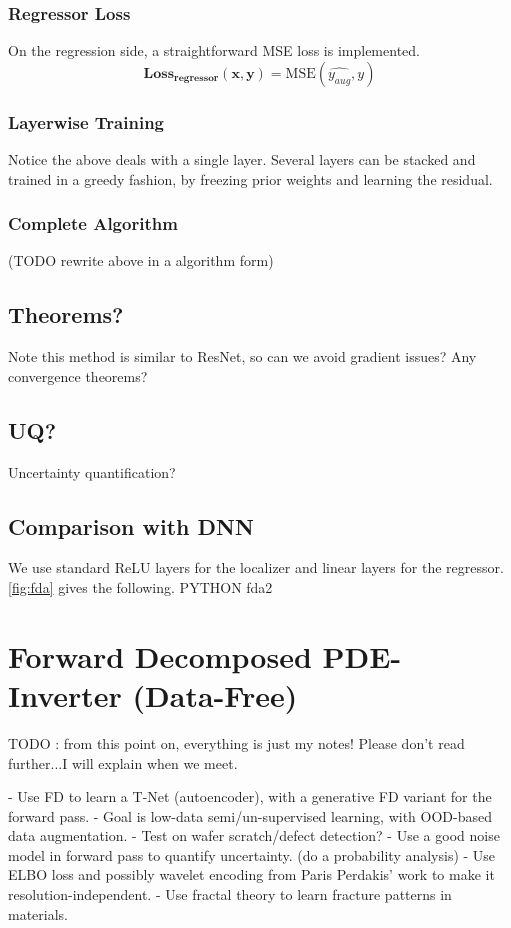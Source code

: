 \subsubsection{Regressor Loss}
On the regression side, a straightforward MSE loss is implemented.
\[
\mathbf{\text{Loss}_\text{regressor}(x,y)} = \text{MSE}(\hat{y_{aug}},y)
\]

\subsubsection{Layerwise Training}
Notice the above deals with a single layer. Several layers can be stacked and trained in a greedy fashion, by freezing prior weights and learning the residual.

\subsubsection{Complete Algorithm}
(TODO rewrite above in a algorithm form)

\subsection{Theorems?}
Note this method is similar to ResNet, so can we avoid gradient issues?
Any convergence theorems?
\subsection{UQ?}
Uncertainty quantification?

\subsection{Comparison with DNN}
We use standard ReLU layers for the localizer and linear layers for the regressor. \ref{fig:fda} gives the following.
PYTHON fda2

\section{Forward Decomposed PDE-Inverter (Data-Free)}

TODO : from this point on, everything is just my notes! 
Please don't read further...I will explain when we meet.

- Use FD to learn a T-Net (autoencoder), with a generative FD variant for the forward pass.
- Goal is low-data semi/un-supervised learning, with OOD-based data augmentation.
- Test on wafer scratch/defect detection?
- Use a good noise model in forward pass to quantify uncertainty. (do a probability analysis)
- Use ELBO loss and possibly wavelet encoding from Paris Perdakis' work to make it resolution-independent.
- Use fractal theory to learn fracture patterns in materials.


